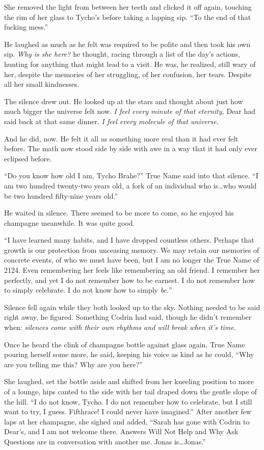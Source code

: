 She removed the light from between her teeth and clicked it off again, touching the rim of her glass to Tycho's before taking a lapping sip. ``To the end of that fucking mess.''

He laughed as much as he felt was required to be polite and then took his own sip. \emph{Why is she here?} he thought, racing through a list of the day's actions, hunting for anything that might lead to a visit. He was, he realized, still wary of her, despite the memories of her struggling, of her confusion, her tears. Despite all her small kindnesses.

The silence drew out. He looked up at the stars and thought about just how much bigger the universe felt now. \emph{I feel every minute of that eternity,} Dear had said back at that same dinner. \emph{I feel every molecule of that universe.}

And he did, now. He felt it all as something more real than it had ever felt before. The math now stood side by side with awe in a way that it had only ever eclipsed before.

``Do you know how old I am, Tycho Brahe?'' True Name said into that silence. ``I am two hundred twenty-two years old, a fork of an individual who is\ldots who would be two hundred fifty-nine years old.''

He waited in silence. There seemed to be more to come, so he enjoyed his champagne meanwhile. It was quite good.

``I have learned many habits, and I have dropped countless others. Perhaps that growth is our protection from unceasing memory. We may retain our memories of concrete events, of who we must have been, but I am no longer the True Name of 2124. Even remembering her feels like remembering an old friend. I remember her perfectly, and yet I do not remember how to be earnest. I do not remember how to simply celebrate. I do not know how to simply \emph{be.}''

Silence fell again while they both looked up to the sky. Nothing needed to be said right away, he figured. Something Codrin had said, though he didn't remember when: \emph{silences come with their own rhythms and will break when it's time.}

Once he heard the clink of champagne bottle against glass again, True Name pouring herself some more, he said, keeping his voice as kind as he could, ``Why are you telling me this? Why are you here?''

She laughed, set the bottle aside and shifted from her kneeling position to more of a lounge, hips canted to the side with her tail draped down the gentle slope of the hill. ``I do not know, Tycho. I do not remember how to celebrate, but I still want to try, I guess. Fifthrace! I could never have imagined.'' After another few laps at her champagne, she sighed and added, ``Sarah has gone with Codrin to Dear's, and I am not welcome there. Answers Will Not Help and Why Ask Questions are in conversation with another me. Jonas is\ldots Jonas.''

